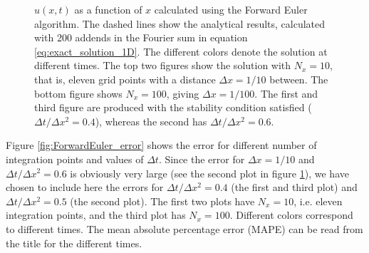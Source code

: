 \documentclass[reprint, english,notitlepage,nofootinbib]{revtex4-1}  %
\begin{document}
\begin{figure}
  \caption{\(u(x, t)\) as a function of \(x\) calculated using the Forward Euler algorithm. The dashed lines show the analytical results, calculated with 200 addends in the Fourier sum in equation \eqref{eq:exact_solution_1D}. The different colors denote the solution at different times. The top two figures show the solution with $N_x = 10$, that is, eleven grid points with a distance \(\Delta x = 1/10\) between. The bottom figure shows \(N_x = 100\), giving \(\Delta x = 1/100\). The first and third figure are produced with the stability condition satisfied (\(\Delta t / \Delta x^2 = 0.4\)), whereas the second has \(\Delta t / \Delta x^2 = 0.6\).}
  \label{fig:ForwardEuler}
\end{figure}

Figure \ref{fig:ForwardEuler_error} shows the error for different number of integration points and values of \(\Delta t\). Since the error for \(\Delta x = 1/10\) and \(\Delta t / \Delta x^2 = 0.6\) is obviously very large (see the second plot in figure \ref{fig:ForwardEuler}), we have chosen to include here the errors for \(\Delta t / \Delta x^2 = 0.4\) (the first and third plot) and \(\Delta t / \Delta x^2 = 0.5\) (the second plot). The first two plots have \(N_x = 10\), i.e. eleven integration points, and the third plot has \(N_x = 100\). Different colors correspond to different times. The mean absolute percentage error (MAPE) can be read from the title for the different times.
\end{document}
